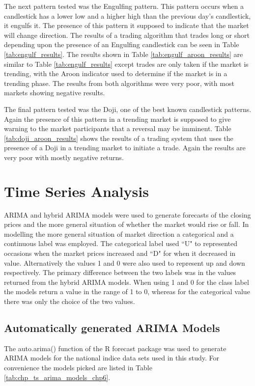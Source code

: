 The next pattern tested was the Engulfing pattern. This pattern occurs when a candlestick has a lower low and a higher high than the previous day's candlestick, it engulfs it. The presence of this pattern it supposed to indicate that the market will change direction. The results of a trading algorithm that trades long or short depending upon the presence of an Engulfing candlestick can be seen in Table \ref{tab:engulf_results}. The results shown in Table \ref{tab:engulf_aroon_results} are similar to Table \ref{tab:engulf_results} except trades are only taken if the market is trending, with the Aroon indicator used to determine if the market is in a trending phase. The results from both algorithms were very poor, with most markets showing negative results.

The final pattern tested was the Doji, one of the best known candlestick patterns. Again the presence of this pattern in a trending market is supposed to give warning to the market participants that a reversal may be imminent. Table \ref{tab:doji_aroon_results} shows the results of a trading system that uses the presence of a Doji in a trending market to initiate a trade. Again the results are very poor with mostly negative returns.

\section{Time Series Analysis}
ARIMA and hybrid ARIMA models were used to generate forecasts of the closing prices and the more general situation of whether the market would rise or fall. In modelling the more general situation of market direction a categorical and a continuous label was employed. The categorical label used \textquotedblleft U" to represented occasions when the market prices increased and \textquotedblleft D" for when it decreased in value. Alternatively the values 1 and 0 were also used to represent up and down respectively. The primary difference between the two labels was in the values returned from the hybrid ARIMA models. When using 1 and 0 for the class label the models return a value in the range of 1 to 0, whereas for the categorical value there was only the choice of the two values. 

\subsection{Automatically generated ARIMA Models}
The auto.arima() function of the R forecast package was used to generate ARIMA models for the national indice data sets used in this study. For convenience the models picked are listed in Table \ref{tab:chp_ts_arima_models_chp6}.

